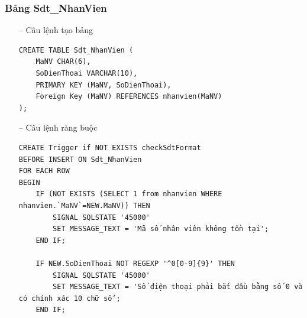 \subsubsection{Bảng Sdt\_NhanVien}
\begin{itemize}
    \item [--] Câu lệnh tạo bảng
   \begin{verbatim}
CREATE TABLE Sdt_NhanVien (
    MaNV CHAR(6),
    SoDienThoai VARCHAR(10),
    PRIMARY KEY (MaNV, SoDienThoai),
    Foreign Key (MaNV) REFERENCES nhanvien(MaNV)
);
    \end{verbatim}
    \item [--] Câu lệnh ràng buộc
    \begin{verbatim}
CREATE Trigger if NOT EXISTS checkSdtFormat 
BEFORE INSERT ON Sdt_NhanVien
FOR EACH ROW
BEGIN 
    IF (NOT EXISTS (SELECT 1 from nhanvien WHERE nhanvien.`MaNV`=NEW.MaNV)) THEN
        SIGNAL SQLSTATE '45000'
        SET MESSAGE_TEXT = 'Mã số nhân viên không tồn tại';
    END IF;

    IF NEW.SoDienThoai NOT REGEXP '^0[0-9]{9}' THEN
        SIGNAL SQLSTATE '45000'
        SET MESSAGE_TEXT = 'Số điện thoại phải bắt đầu bằng số 0 và có chính xác 10 chữ số';
    END IF;


\end{verbatim}
\end{itemize}
